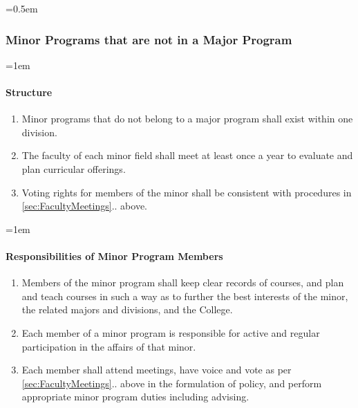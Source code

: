 \documentclass{manual}
\let\oldsubsubsection\subsubsection
\renewcommand\subsubsection{\leftskip=0.5em\oldsubsubsection}
\let\oldparagraph\paragraph
\renewcommand\paragraph{\leftskip=1em\oldparagraph}
\newcommand{\itemLevelA}{\alph*.}
\newcommand{\itemRefA}{\alph*}
\begin{document}
\subsubsection{Minor Programs that are not in a Major Program}
\paragraph{Structure}
\begin{enumerate}[label=\itemLevelA,ref=\itemRefA]
\item Minor programs that do not belong to a major program shall exist within one division.

\item The faculty of each minor field shall meet at least once a year to evaluate and plan curricular offerings. 
\item Voting rights for members of the minor shall be consistent with procedures in \cref{sec:FacultyMeetings}.. above.
\end{enumerate}

\paragraph{Responsibilities of Minor Program Members}
\begin{enumerate}[label=\itemLevelA,ref=\itemRefA]
\item Members of the minor program shall keep clear records of courses, and plan and teach courses in such a way as to further the best interests of the minor, the related majors and divisions, and the College.
\item Each member of a minor program is responsible for active and regular participation in the affairs of that minor.
\item Each member shall attend meetings, have voice and vote as per \cref{sec:FacultyMeetings}.. above in the formulation of policy, and perform appropriate minor program duties including advising.
\end{enumerate}

\end{document}
